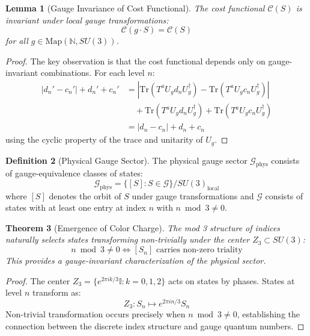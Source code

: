 \documentclass[11pt]{article}
\numberwithin{equation}{section}
\newtheorem{theorem}{Theorem}[section]
\newtheorem{lemma}[theorem]{Lemma}
\theoremstyle{definition}
\newtheorem{definition}[theorem]{Definition}
\theoremstyle{remark}
\begin{document}
\begin{lemma}[Gauge Invariance of Cost Functional]
The cost functional $\mathcal{C}(S)$ is invariant under local gauge transformations:
\begin{equation}
\mathcal{C}(g \cdot S) = \mathcal{C}(S)
\end{equation}
for all $g \in \text{Map}(\mathbb{N}, SU(3))$.
\end{lemma}

\begin{proof}
The key observation is that the cost functional depends only on gauge-invariant combinations. For each level $n$:
\begin{align}
|d_n' - c_n'| + d_n' + c_n' &= |\text{Tr}(T^a U_g d_n U_g^\dagger) - \text{Tr}(T^a U_g c_n U_g^\dagger)| \\
&\quad + \text{Tr}(T^a U_g d_n U_g^\dagger) + \text{Tr}(T^a U_g c_n U_g^\dagger) \\
&= |d_n - c_n| + d_n + c_n
\end{align}
using the cyclic property of the trace and unitarity of $U_g$.
\end{proof}

\begin{definition}[Physical Gauge Sector]
The physical gauge sector $\mathcal{G}_{\text{phys}}$ consists of gauge-equivalence classes of states:
\begin{equation}
\mathcal{G}_{\text{phys}} = \{[S] : S \in \mathcal{G}\} / SU(3)_{\text{local}}
\end{equation}
where $[S]$ denotes the orbit of $S$ under gauge transformations and $\mathcal{G}$ consists of states with at least one entry at index $n$ with $n \bmod 3 \neq 0$.
\end{definition}

\begin{theorem}[Emergence of Color Charge]
The mod 3 structure of indices naturally selects states transforming non-trivially under the center $Z_3 \subset SU(3)$:
\begin{equation}
n \bmod 3 \neq 0 \iff [S_n] \text{ carries non-zero triality}
\end{equation}
This provides a gauge-invariant characterization of the physical sector.
\end{theorem}

\begin{proof}
The center $Z_3 = \{e^{2\pi i k/3} \mathbb{I} : k = 0,1,2\}$ acts on states by phases. States at level $n$ transform as:
\begin{equation}
Z_3: S_n \mapsto e^{2\pi i n/3} S_n
\end{equation}
Non-trivial transformation occurs precisely when $n \bmod 3 \neq 0$, establishing the connection between the discrete index structure and gauge quantum numbers.
\end{proof}
\end{document}
